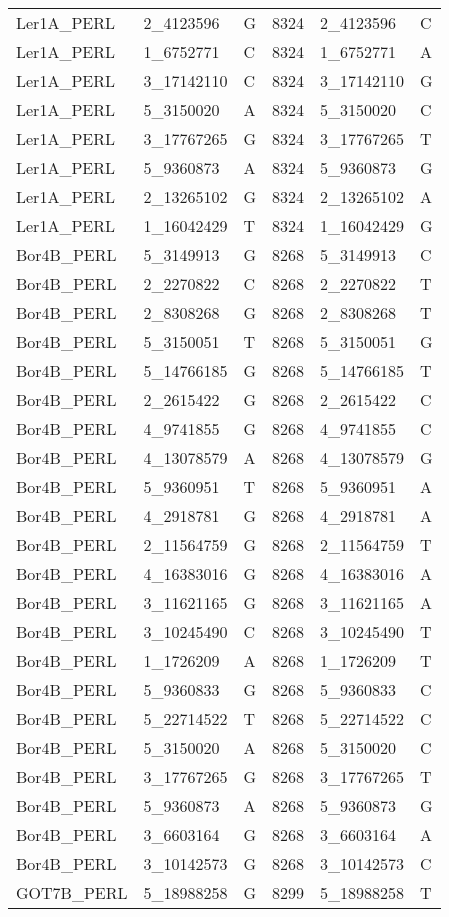 \begin{center}
\begin{longtable}{|l|l|l|l|l|l|}
Ler1A\_PERL&2\_4123596&G&8324&2\_4123596&C\\
Ler1A\_PERL&1\_6752771&C&8324&1\_6752771&A\\
Ler1A\_PERL&3\_17142110&C&8324&3\_17142110&G\\
Ler1A\_PERL&5\_3150020&A&8324&5\_3150020&C\\
Ler1A\_PERL&3\_17767265&G&8324&3\_17767265&T\\
Ler1A\_PERL&5\_9360873&A&8324&5\_9360873&G\\
Ler1A\_PERL&2\_13265102&G&8324&2\_13265102&A\\
Ler1A\_PERL&1\_16042429&T&8324&1\_16042429&G\\
Bor4B\_PERL&5\_3149913&G&8268&5\_3149913&C\\
Bor4B\_PERL&2\_2270822&C&8268&2\_2270822&T\\
Bor4B\_PERL&2\_8308268&G&8268&2\_8308268&T\\
Bor4B\_PERL&5\_3150051&T&8268&5\_3150051&G\\
Bor4B\_PERL&5\_14766185&G&8268&5\_14766185&T\\
Bor4B\_PERL&2\_2615422&G&8268&2\_2615422&C\\
Bor4B\_PERL&4\_9741855&G&8268&4\_9741855&C\\
Bor4B\_PERL&4\_13078579&A&8268&4\_13078579&G\\
Bor4B\_PERL&5\_9360951&T&8268&5\_9360951&A\\
Bor4B\_PERL&4\_2918781&G&8268&4\_2918781&A\\
Bor4B\_PERL&2\_11564759&G&8268&2\_11564759&T\\
Bor4B\_PERL&4\_16383016&G&8268&4\_16383016&A\\
Bor4B\_PERL&3\_11621165&G&8268&3\_11621165&A\\
Bor4B\_PERL&3\_10245490&C&8268&3\_10245490&T\\
Bor4B\_PERL&1\_1726209&A&8268&1\_1726209&T\\
Bor4B\_PERL&5\_9360833&G&8268&5\_9360833&C\\
Bor4B\_PERL&5\_22714522&T&8268&5\_22714522&C\\
Bor4B\_PERL&5\_3150020&A&8268&5\_3150020&C\\
Bor4B\_PERL&3\_17767265&G&8268&3\_17767265&T\\
Bor4B\_PERL&5\_9360873&A&8268&5\_9360873&G\\
Bor4B\_PERL&3\_6603164&G&8268&3\_6603164&A\\
Bor4B\_PERL&3\_10142573&G&8268&3\_10142573&C\\
GOT7B\_PERL&5\_18988258&G&8299&5\_18988258&T\\

\end{longtable}
\end{center}
